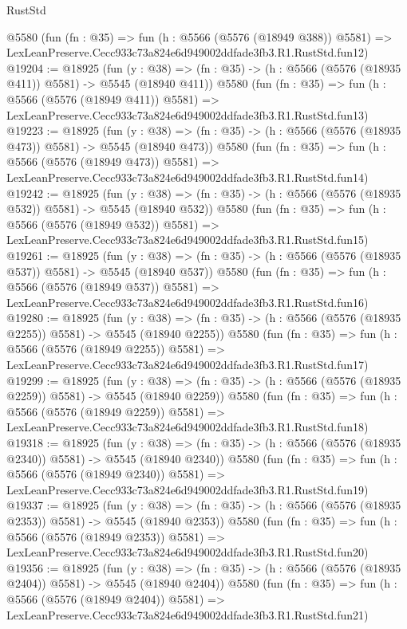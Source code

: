 \begin{lexlean}{RustStd}
\begin{coremodule}
    @5580
    (fun (fn : @35) =>
    fun (h : @5566 (@5576 (@18949 @388)) @5581) =>
    LexLeanPreserve.Cecc933c73a824e6d949002ddfade3fb3.R1.RustStd.fun12)
@19204 := @18925
    (fun (y : @38) => (fn : @35) -> (h : @5566 (@5576 (@18935 @411)) @5581) -> @5545 (@18940 @411))
    @5580
    (fun (fn : @35) =>
    fun (h : @5566 (@5576 (@18949 @411)) @5581) =>
    LexLeanPreserve.Cecc933c73a824e6d949002ddfade3fb3.R1.RustStd.fun13)
@19223 := @18925
    (fun (y : @38) => (fn : @35) -> (h : @5566 (@5576 (@18935 @473)) @5581) -> @5545 (@18940 @473))
    @5580
    (fun (fn : @35) =>
    fun (h : @5566 (@5576 (@18949 @473)) @5581) =>
    LexLeanPreserve.Cecc933c73a824e6d949002ddfade3fb3.R1.RustStd.fun14)
@19242 := @18925
    (fun (y : @38) => (fn : @35) -> (h : @5566 (@5576 (@18935 @532)) @5581) -> @5545 (@18940 @532))
    @5580
    (fun (fn : @35) =>
    fun (h : @5566 (@5576 (@18949 @532)) @5581) =>
    LexLeanPreserve.Cecc933c73a824e6d949002ddfade3fb3.R1.RustStd.fun15)
@19261 := @18925
    (fun (y : @38) => (fn : @35) -> (h : @5566 (@5576 (@18935 @537)) @5581) -> @5545 (@18940 @537))
    @5580
    (fun (fn : @35) =>
    fun (h : @5566 (@5576 (@18949 @537)) @5581) =>
    LexLeanPreserve.Cecc933c73a824e6d949002ddfade3fb3.R1.RustStd.fun16)
@19280 := @18925
    (fun (y : @38) =>
    (fn : @35) -> (h : @5566 (@5576 (@18935 @2255)) @5581) -> @5545 (@18940 @2255))
    @5580
    (fun (fn : @35) =>
    fun (h : @5566 (@5576 (@18949 @2255)) @5581) =>
    LexLeanPreserve.Cecc933c73a824e6d949002ddfade3fb3.R1.RustStd.fun17)
@19299 := @18925
    (fun (y : @38) =>
    (fn : @35) -> (h : @5566 (@5576 (@18935 @2259)) @5581) -> @5545 (@18940 @2259))
    @5580
    (fun (fn : @35) =>
    fun (h : @5566 (@5576 (@18949 @2259)) @5581) =>
    LexLeanPreserve.Cecc933c73a824e6d949002ddfade3fb3.R1.RustStd.fun18)
@19318 := @18925
    (fun (y : @38) =>
    (fn : @35) -> (h : @5566 (@5576 (@18935 @2340)) @5581) -> @5545 (@18940 @2340))
    @5580
    (fun (fn : @35) =>
    fun (h : @5566 (@5576 (@18949 @2340)) @5581) =>
    LexLeanPreserve.Cecc933c73a824e6d949002ddfade3fb3.R1.RustStd.fun19)
@19337 := @18925
    (fun (y : @38) =>
    (fn : @35) -> (h : @5566 (@5576 (@18935 @2353)) @5581) -> @5545 (@18940 @2353))
    @5580
    (fun (fn : @35) =>
    fun (h : @5566 (@5576 (@18949 @2353)) @5581) =>
    LexLeanPreserve.Cecc933c73a824e6d949002ddfade3fb3.R1.RustStd.fun20)
@19356 := @18925
    (fun (y : @38) =>
    (fn : @35) -> (h : @5566 (@5576 (@18935 @2404)) @5581) -> @5545 (@18940 @2404))
    @5580
    (fun (fn : @35) =>
    fun (h : @5566 (@5576 (@18949 @2404)) @5581) =>
    LexLeanPreserve.Cecc933c73a824e6d949002ddfade3fb3.R1.RustStd.fun21)

\end{coremodule}
\end{lexlean}
